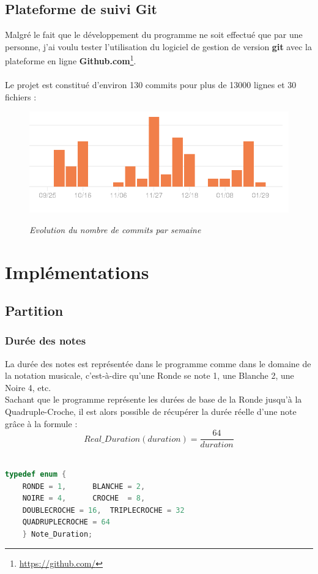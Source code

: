\documentclass[12pt]{report}
\begin{document}
\section{Plateforme de suivi Git}
Malgré le fait que le développement du programme ne soit effectué que par une personne, j'ai voulu tester l'utilisation du logiciel de gestion de version \textbf{git}
avec la plateforme en ligne \textbf{Github.com}\footnote{\url{https://github.com/}}.\\ \\
Le projet est constitué d'environ 130 commits pour plus de 13000 lignes et 30 fichiers :\\

\begin{figure}[H]
  \centering
  \includegraphics[scale=0.58]{git2.png}\\
    \caption{\textit{Evolution du nombre de commits par semaine}}
\end{figure}


\chapter{Implémentations}
\section{Partition}
\subsection{Durée des notes}
La durée des notes est représentée dans le programme comme dans le domaine de la notation musicale, c'est-à-dire qu'une Ronde se note 1, une Blanche 2, une Noire 4, etc.\\
Sachant que le programme représente les durées de base de la Ronde jusqu'à la Quadruple-Croche, il est alors possible de récupérer la durée réelle d'une note grâce à la formule :\\
\[ Real\_Duration(duration) = \frac{64}{duration} \]\\
\lstset{style=CLangage}
\begin{lstlisting}[language=C]
typedef enum {
	RONDE = 1,		BLANCHE	= 2,
	NOIRE = 4,		CROCHE	= 8,
	DOUBLECROCHE = 16, 	TRIPLECROCHE = 32
	QUADRUPLECROCHE = 64
	} Note_Duration;
\end{lstlisting}
\newpage
\end{document}
